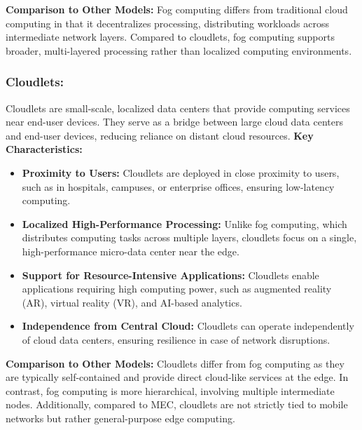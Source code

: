 \documentclass[runningheads]{llncs}
\begin{document}
\textbf{Comparison to Other Models:}  
Fog computing differs from traditional cloud computing in that it decentralizes processing, distributing workloads across intermediate network layers. Compared to cloudlets, fog computing supports broader, multi-layered processing rather than localized computing environments.

\subsubsection{Cloudlets:}
Cloudlets are small-scale, localized data centers that provide computing services near end-user devices. They serve as a bridge between large cloud data centers and end-user devices, reducing reliance on distant cloud resources.
\textbf{Key Characteristics:}
\begin{itemize}
    \item \textbf{Proximity to Users:} Cloudlets are deployed in close proximity to users, such as in hospitals, campuses, or enterprise offices, ensuring low-latency computing.
    \item \textbf{Localized High-Performance Processing:} Unlike fog computing, which distributes computing tasks across multiple layers, cloudlets focus on a single, high-performance micro-data center near the edge.
    \item \textbf{Support for Resource-Intensive Applications:} Cloudlets enable applications requiring high computing power, such as augmented reality (AR), virtual reality (VR), and AI-based analytics.
    \item \textbf{Independence from Central Cloud:} Cloudlets can operate independently of cloud data centers, ensuring resilience in case of network disruptions.
\end{itemize}

\textbf{Comparison to Other Models:}  
Cloudlets differ from fog computing as they are typically self-contained and provide direct cloud-like services at the edge. In contrast, fog computing is more hierarchical, involving multiple intermediate nodes. Additionally, compared to MEC, cloudlets are not strictly tied to mobile networks but rather general-purpose edge computing.
\end{document}
